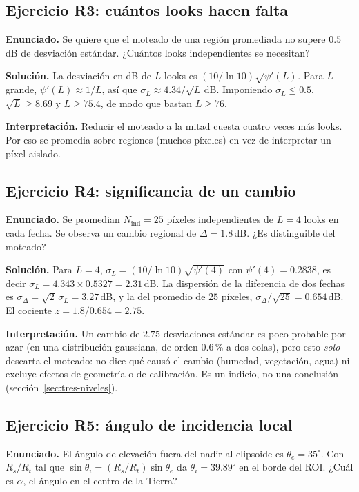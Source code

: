 \documentclass[11pt,a4paper]{article}
\begin{document}
\subsection*{Ejercicio R3: cuántos looks hacen falta}
\textbf{Enunciado.} Se quiere que el moteado de una región promediada no supere $0.5$\,dB de desviación
estándar. ¿Cuántos looks independientes se necesitan?

\textbf{Solución.} La desviación en dB de $L$ looks es $(10/\ln10)\sqrt{\psi'(L)}$. Para $L$ grande,
$\psi'(L)\approx1/L$, así que $\sigma_L\approx4.34/\sqrt L$\,dB. Imponiendo $\sigma_L\le0.5$, $\sqrt L\ge8.69$ y
$L\ge75.4$, de modo que bastan $L\ge76$.

\textbf{Interpretación.} Reducir el moteado a la mitad cuesta cuatro veces más looks. Por eso se promedia
sobre regiones (muchos píxeles) en vez de interpretar un píxel aislado.

\subsection*{Ejercicio R4: significancia de un cambio}
\textbf{Enunciado.} Se promedian $N_{\mathrm{ind}}=25$ píxeles independientes de $L=4$ looks en cada fecha. Se
observa un cambio regional de $\Delta=1.8$\,dB. ¿Es distinguible del moteado?

\textbf{Solución.} Para $L=4$, $\sigma_L=(10/\ln10)\sqrt{\psi'(4)}$ con $\psi'(4)=0.2838$, es decir
$\sigma_L=4.343\times0.5327=2.31$\,dB. La dispersión de la diferencia de dos fechas es
$\sigma_\Delta=\sqrt2\,\sigma_L=3.27$\,dB, y la del promedio de $25$ píxeles,
$\sigma_\Delta/\sqrt{25}=0.654$\,dB. El cociente $z=1.8/0.654=2.75$.

\textbf{Interpretación.} Un cambio de $2.75$ desviaciones estándar es poco probable por azar (en una
distribución gaussiana, de orden $0.6\,\mathrm{\%}$ a dos colas), pero esto \emph{solo} descarta el moteado: no dice
qué causó el cambio (humedad, vegetación, agua) ni excluye efectos de geometría o de calibración. Es un
indicio, no una conclusión (sección~\ref{sec:tres-niveles}).

\subsection*{Ejercicio R5: ángulo de incidencia local}
\textbf{Enunciado.} El ángulo de elevación fuera del nadir al elipsoide es $\theta_e=35^\circ$. Con $R_s/R_t$ tal
que $\sin\theta_i=(R_s/R_t)\sin\theta_e$ da $\theta_i=39.89^\circ$ en el borde del ROI. ¿Cuál es $\alpha$, el
ángulo en el centro de la Tierra?
\end{document}
